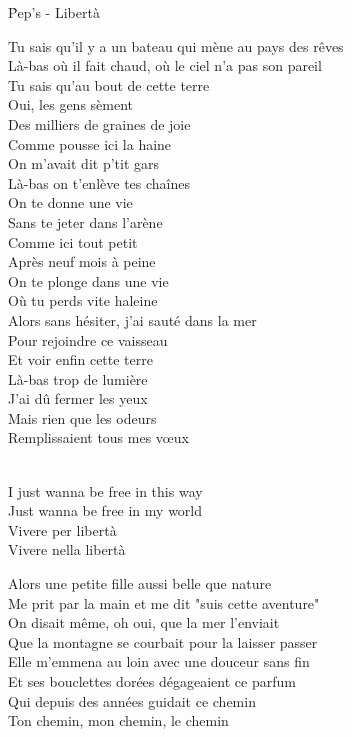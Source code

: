 \documentclass{novel}
\begin{document}
\newpage
\normalsize
\h*{Pep’s - Libertà}
\begin{multicols}{2}
Tu sais qu'il y a un bateau qui mène au pays des rêves \\
Là-bas où il fait chaud, où le ciel n'a pas son pareil \\
Tu sais qu'au bout de cette terre \\
Oui, les gens sèment \\
Des milliers de graines de joie \\
Comme pousse ici la haine \\
On m'avait dit p'tit gars \\
Là-bas on t'enlève tes chaînes \\
On te donne une vie \\
Sans te jeter dans l'arène \\
Comme ici tout petit \\
Après neuf mois à peine \\
On te plonge dans une vie \\
Où tu perds vite haleine \\
Alors sans hésiter, j'ai sauté dans la mer \\
Pour rejoindre ce vaisseau \\
Et voir enfin cette terre \\
Là-bas trop de lumière \\
J'ai dû fermer les yeux \\
Mais rien que les odeurs \\
Remplissaient tous mes vœux \\

\begin{bfseries}
[Refrain:]\\
I just wanna be free in this way \\
Just wanna be free in my world \\
Vivere per libertà \\
Vivere nella libertà \\
\end{bfseries}

Alors une petite fille aussi belle que nature \\
Me prit par la main et me dit "suis cette aventure" \\
On disait même, oh oui, que la mer l'enviait \\
Que la montagne se courbait pour la laisser passer \\
Elle m'emmena au loin avec une douceur sans fin \\
Et ses bouclettes dorées dégageaient ce parfum \\
Qui depuis des années guidait ce chemin \\
Ton chemin, mon chemin, le chemin \\


\end{multicols}
\end{document}
